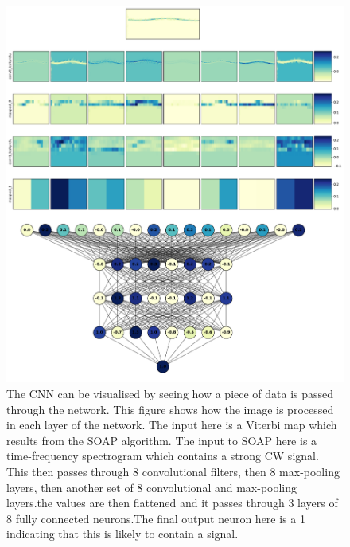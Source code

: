 \begin{figure}[h]
	\centering
	\includegraphics[width=\textwidth]{C4_cnn/vitmap_cnn_visualisation_signal.pdf}
	\caption[Network visualisation for a signal injection]{The \gls{CNN} can be visualised by seeing how a piece of data is passed through the network. This figure shows how the image is processed in each layer of the network. The input here is a Viterbi map which results from the SOAP algorithm. The input to SOAP here is a time-frequency spectrogram which contains a strong \gls{CW} signal. This then passes through 8 convolutional filters, then 8 max-pooling layers, then another set of 8 convolutional and max-pooling layers.the values are then flattened and it passes through 3 layers of 8 fully connected neurons.The final output neuron here is a 1 indicating that this is likely to contain a signal. }
	\label{machine:cnn:vis:vitmap:signal}
\end{figure}

